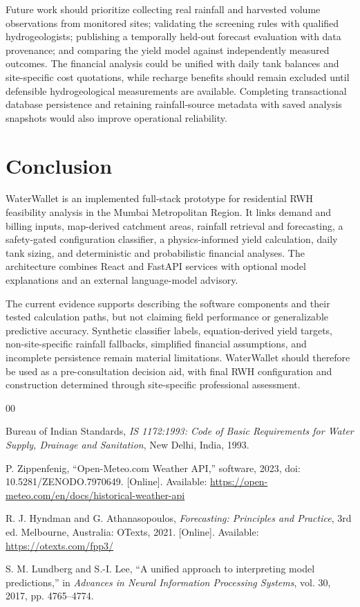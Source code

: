 \documentclass[conference]{IEEEtran}
\begin{document}
Future work should prioritize collecting real rainfall and harvested
volume observations from monitored sites; validating the screening rules
with qualified hydrogeologists; publishing a temporally held-out
forecast evaluation with data provenance; and comparing the yield model
against independently measured outcomes. The financial analysis could
be unified with daily tank balances and site-specific cost quotations,
while recharge benefits should remain excluded until defensible
hydrogeological measurements are available. Completing transactional
database persistence and retaining rainfall-source metadata with saved
analysis snapshots would also improve operational reliability.

\section{Conclusion}
\label{sec:conclusion}

WaterWallet is an implemented full-stack prototype for residential RWH
feasibility analysis in the Mumbai Metropolitan Region. It links demand
and billing inputs, map-derived catchment areas, rainfall retrieval and
forecasting, a safety-gated configuration classifier, a physics-informed
yield calculation, daily tank sizing, and deterministic and
probabilistic financial analyses. The architecture combines React and
FastAPI services with optional model explanations and an external
language-model advisory.

The current evidence supports describing the software components and
their tested calculation paths, but not claiming field performance or
generalizable predictive accuracy. Synthetic classifier labels,
equation-derived yield targets, non-site-specific rainfall fallbacks, simplified
financial assumptions, and incomplete persistence remain material
limitations. WaterWallet should therefore be used as a pre-consultation
decision aid, with final RWH configuration and construction determined
through site-specific professional assessment.

\begin{thebibliography}{00}

Bureau of Indian Standards, \textit{IS 1172:1993: Code of Basic
Requirements for Water Supply, Drainage and Sanitation}, New Delhi,
India, 1993.

P. Zippenfenig, ``Open-Meteo.com Weather API,'' software, 2023,
doi: 10.5281/ZENODO.7970649. [Online]. Available:
\url{https://open-meteo.com/en/docs/historical-weather-api}

R. J. Hyndman and G. Athanasopoulos, \textit{Forecasting: Principles
and Practice}, 3rd ed. Melbourne, Australia: OTexts, 2021. [Online].
Available: \url{https://otexts.com/fpp3/}

S. M. Lundberg and S.-I. Lee, ``A unified approach to interpreting
model predictions,'' in \textit{Advances in Neural Information
Processing Systems}, vol. 30, 2017, pp. 4765--4774.

\end{thebibliography}
\end{document}
